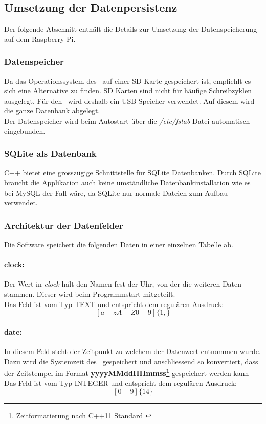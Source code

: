 \subsection{Umsetzung der Datenpersistenz}
    Der folgende Abschnitt enthält die Details zur Umsetzung der Datenspeicherung auf dem Raspberry Pi.
    \subsubsection{Datenspeicher}
    Da das Operationssystem des \rpi\ auf einer SD Karte gespeichert ist, empfiehlt es sich eine Alternative zu finden. SD Karten sind nicht für häufige Schreibzyklen ausgelegt. Für den \documenttitle\ wird deshalb ein USB Speicher verwendet. Auf diesem wird die ganze Datenbank abgelegt.\\
    Der Datenspeicher wird beim Autostart über die \textit{/etc/fstab} Datei automatisch eingebunden.
    
    \subsubsection{SQLite als Datenbank}
    C++ bietet eine grosszügige Schnittstelle für SQLite Datenbanken. Durch SQLite braucht die Applikation auch keine umständliche Datenbankinstallation wie es bei MySQL der Fall wäre, da SQLite nur normale Dateien zum Aufbau verwendet.
    
    \subsubsection{Architektur der Datenfelder}
    Die Software speichert die folgenden Daten in einer einzelnen Tabelle ab.
    \paragraph{clock:}
    Der Wert in \textit{clock} hält den Namen fest der Uhr, von der die weiteren Daten stammen. Dieser wird beim Programmstart mitgeteilt.\\
    Das Feld ist vom Typ TEXT und entspricht dem regulären Ausdruck:
    $$[a-zA-Z0-9]\{1,\}$$
    \paragraph{date:}\label{sec:db_date}
    In diesem Feld steht der Zeitpunkt zu welchem der Datenwert entnommen wurde. Dazu wird die Systemzeit des \rpi\ gespeichert und anschliessend so konvertiert, dass der Zeitstempel im Format \textbf{yyyyMMddHHmmss\footnote{Zeitformatierung nach C++11 Standard \cite{puttime}}} gespeichert werden kann\\
    Das Feld ist vom Typ INTEGER und entspricht dem regulären Ausdruck:
    $$[0-9]\{14\}$$
